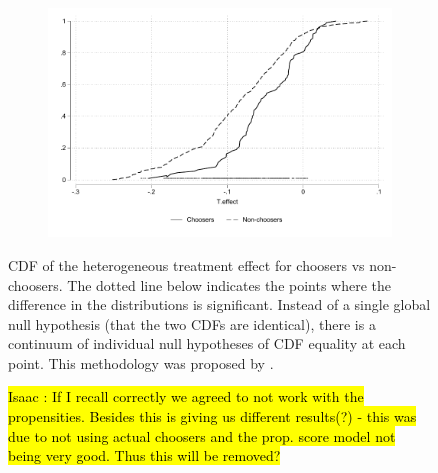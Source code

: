 \documentclass[oneside,11pt]{article}
\begin{document}
\begin{figure}[H]
\begin{center}
\begin{subfigure}{0.475\textwidth}
        \includegraphics[width=\textwidth]{Figuras/cdf_predchoose_tau_def.pdf}
    \end{subfigure}
    \end{center}
     \scriptsize    CDF of the heterogeneous treatment effect for choosers vs non-choosers. The dotted line below indicates the points where the difference in the distributions is significant.  Instead of a single global null hypothesis (that the two CDFs are identical), there is a continuum of individual null hypotheses of CDF equality at each point. This methodology was proposed by \cite{GOLDMAN2018143}.
     
     
     \hl{Isaac : If I recall correctly we agreed to not work with the propensities. Besides this is giving us different results(?) - this was due to not using actual choosers and the prop. score model not being very good. Thus this will be removed? }
\end{figure}

















\newpage

\end{document}
